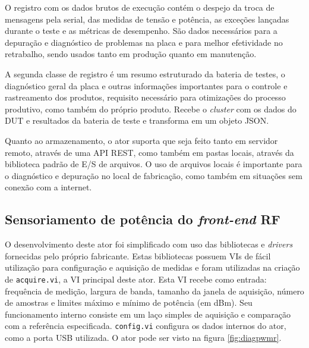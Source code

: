             
            O registro com os dados brutos de execução contém o despejo da troca de mensagens pela serial, das medidas de tensão e potência, as exceções lançadas durante o teste e as métricas de desempenho. São dados necessários para a depuração e diagnóstico de problemas na placa e para melhor efetividade no retrabalho, sendo usados tanto em produção quanto em manutenção.
            
            A segunda classe de registro é um resumo estruturado da bateria de testes, o diagnóstico geral da placa e outras informações importantes para o controle e rastreamento dos produtos, requisito necessário para otimizações do processo produtivo, como também do próprio produto. Recebe o \textit{cluster} com os dados do DUT e resultados da bateria de teste e transforma em um objeto JSON.
            
            Quanto ao armazenamento, o ator suporta que seja feito tanto em servidor remoto, através de uma API REST, como também em pastas locais, através da biblioteca padrão de E/S de arquivos. O uso de arquivos locais é importante para o diagnóstico e depuração no local de fabricação, como também em situações sem conexão com a internet.
            
            
        \subsection{Sensoriamento de potência do \textit{front-end} RF}
        \label{pwmodel}
           
             
            
            O desenvolvimento deste ator foi simplificado com uso das bibliotecas e \textit{drivers} fornecidas pelo próprio fabricante. Estas bibliotecas possuem VIs de fácil utilização para configuração e aquisição de medidas e foram utilizadas na criação de \texttt{acquire.vi}, a VI principal deste ator. Esta VI recebe como entrada: frequência de medição, largura de banda, tamanho da janela de aquisição, número de amostras e limites máximo e mínimo de potência (em dBm). Seu funcionamento interno consiste em um laço simples de aquisição e comparação com a referência especificada. \texttt{config.vi} configura os dados internos do ator, como a porta USB utilizada. O ator pode ser visto na figura \ref{fig:diagpwmr}.
            
